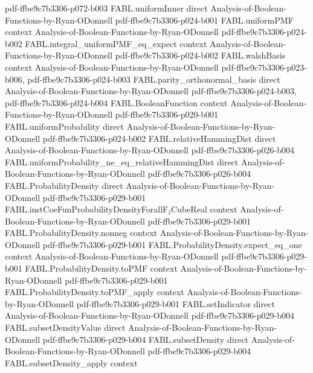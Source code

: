 \begin{theorem}
  {pdf-ffbe9c7b3306-p072-b003}
\proofstep
  {FABL.uniformInner}
  {direct}
  {Analysis-of-Boolean-Functions-by-Ryan-ODonnell}
  {pdf-ffbe9c7b3306-p024-b001}
\proofstep
  {FABL.uniformPMF}
  {context}
  {Analysis-of-Boolean-Functions-by-Ryan-ODonnell}
  {pdf-ffbe9c7b3306-p024-b002}
\proofstep
  {FABL.integral_uniformPMF_eq_expect}
  {context}
  {Analysis-of-Boolean-Functions-by-Ryan-ODonnell}
  {pdf-ffbe9c7b3306-p024-b002}
\proofstep
  {FABL.walshBasis}
  {context}
  {Analysis-of-Boolean-Functions-by-Ryan-ODonnell}
  {pdf-ffbe9c7b3306-p023-b006,
    pdf-ffbe9c7b3306-p024-b003}
\proofstep
  {FABL.parity_orthonormal_basis}
  {direct}
  {Analysis-of-Boolean-Functions-by-Ryan-ODonnell}
  {pdf-ffbe9c7b3306-p024-b003,
    pdf-ffbe9c7b3306-p024-b004}
\proofstep
  {FABL.BooleanFunction}
  {context}
  {Analysis-of-Boolean-Functions-by-Ryan-ODonnell}
  {pdf-ffbe9c7b3306-p020-b001}
\proofstep
  {FABL.uniformProbability}
  {direct}
  {Analysis-of-Boolean-Functions-by-Ryan-ODonnell}
  {pdf-ffbe9c7b3306-p024-b002}
\proofstep
  {FABL.relativeHammingDist}
  {direct}
  {Analysis-of-Boolean-Functions-by-Ryan-ODonnell}
  {pdf-ffbe9c7b3306-p026-b004}
\proofstep
  {FABL.uniformProbability_ne_eq_relativeHammingDist}
  {direct}
  {Analysis-of-Boolean-Functions-by-Ryan-ODonnell}
  {pdf-ffbe9c7b3306-p026-b004}
\proofstep
  {FABL.ProbabilityDensity}
  {direct}
  {Analysis-of-Boolean-Functions-by-Ryan-ODonnell}
  {pdf-ffbe9c7b3306-p029-b001}
\proofstep
  {FABL.instCoeFunProbabilityDensityForallF₂CubeReal}
  {context}
  {Analysis-of-Boolean-Functions-by-Ryan-ODonnell}
  {pdf-ffbe9c7b3306-p029-b001}
\proofstep
  {FABL.ProbabilityDensity.nonneg}
  {context}
  {Analysis-of-Boolean-Functions-by-Ryan-ODonnell}
  {pdf-ffbe9c7b3306-p029-b001}
\proofstep
  {FABL.ProbabilityDensity.expect_eq_one}
  {context}
  {Analysis-of-Boolean-Functions-by-Ryan-ODonnell}
  {pdf-ffbe9c7b3306-p029-b001}
\proofstep
  {FABL.ProbabilityDensity.toPMF}
  {context}
  {Analysis-of-Boolean-Functions-by-Ryan-ODonnell}
  {pdf-ffbe9c7b3306-p029-b001}
\proofstep
  {FABL.ProbabilityDensity.toPMF_apply}
  {context}
  {Analysis-of-Boolean-Functions-by-Ryan-ODonnell}
  {pdf-ffbe9c7b3306-p029-b001}
\proofstep
  {FABL.setIndicator}
  {direct}
  {Analysis-of-Boolean-Functions-by-Ryan-ODonnell}
  {pdf-ffbe9c7b3306-p029-b004}
\proofstep
  {FABL.subsetDensityValue}
  {direct}
  {Analysis-of-Boolean-Functions-by-Ryan-ODonnell}
  {pdf-ffbe9c7b3306-p029-b004}
\proofstep
  {FABL.subsetDensity}
  {direct}
  {Analysis-of-Boolean-Functions-by-Ryan-ODonnell}
  {pdf-ffbe9c7b3306-p029-b004}
\proofstep
  {FABL.subsetDensity_apply}
  {context}

\end{theorem}
